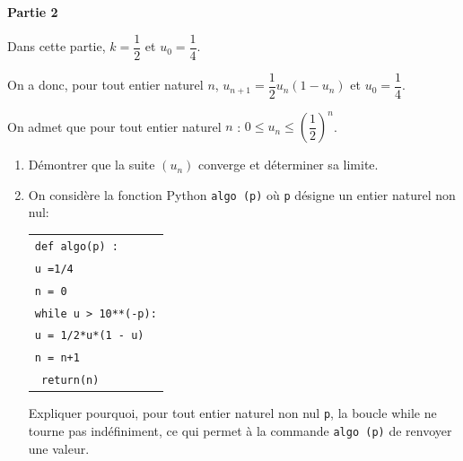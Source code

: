 \documentclass[10pt]{article}
\begin{document}
\bigskip

\textbf{Partie 2}

\medskip

 Dans cette partie, $k= \dfrac12$  et $u_0 = \dfrac14$.

On a donc, pour tout entier naturel $n$,\: $u_{n+1} = \dfrac12 u_n \left(1 - u_n\right)$ et $u_0 = \dfrac14$.

On admet que pour tout entier naturel $n$ :\: $0 \leqslant u_n \leqslant \left(\dfrac12\right)^n$.

\medskip

\begin{enumerate}
\item Démontrer que la suite $\left(u_n\right)$ converge et déterminer sa limite.
\item On considère la fonction Python \texttt{algo (p)} où \texttt{p} désigne un entier naturel non nul:

\begin{center}
\begin{tabular}{|l|}\hline
\texttt{def algo(p) :}\\
\quad  \texttt{u =1/4}\\
\quad \texttt{n = 0}\\
\quad \texttt{while u > 10**(-p):}\\
\quad \quad \texttt{u = 1/2*u*(1 - u)}\\
\quad \quad \texttt{n = n+1}\\
\quad \texttt{ return(n)}\\ \hline
\end{tabular}
\end{center}
Expliquer pourquoi, pour tout entier naturel non nul \texttt{p}, la boucle while ne tourne pas indéfiniment, ce qui permet à la commande \texttt{algo (p)} de renvoyer une valeur.
\end{enumerate}

\bigskip
\end{document}
